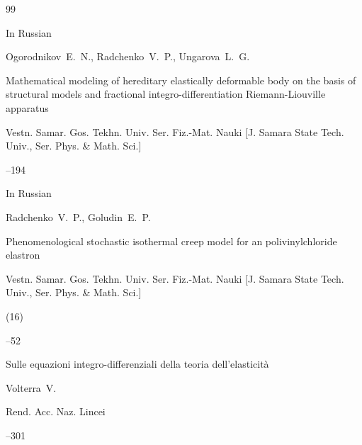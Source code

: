\documentclass[11pt,a4paper,twoside]{article}
\begin{document}
\begin{thebibliography}{99}







\lang In Russian


\by Ogorodnikov~E.~N., Radchenko~V.~P., Ungarova~L.~G.


\paper Mathematical modeling of hereditary elastically deformable body on the basis of structural models and fractional integro-differentiation Riemann-Liouville apparatus


\jour Vestn. Samar. Gos. Tekhn. Univ. Ser. Fiz.-Mat. Nauki \rm [J. Samara State Tech. Univ., Ser. Phys. \& Math. Sci.]








--194













\lang In Russian


\by Radchenko~V.~P., Goludin~E.~P.


\paper Phenomenological stochastic isothermal creep model for an polivinylchloride elastron


\jour Vestn. Samar. Gos. Tekhn. Univ. Ser. Fiz.-Mat. Nauki  \rm [J. Samara State Tech. Univ., Ser. Phys. \& Math. Sci.]




(16)


--52









\paper Sulle equazioni integro-differenziali della teoria dell'elasticit\`a 


\by Volterra~V.


\jour Rend. Acc. Naz. Lincei






–301



\end{thebibliography}
\end{document}
